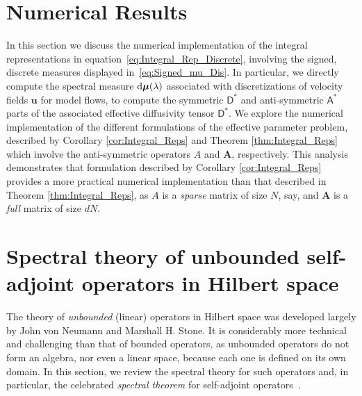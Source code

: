 \documentclass[leqno,onefignum,onetabnum]{siamltex1213}
\renewcommand{\d}{\mathrm{d}}
\newcommand{\Ab}{\mathbf{A}}
\newcommand{\Dm}{\mathsf{D}}
\newcommand{\Am}{\mathsf{A}}
\newcommand\bmu{\mbox{\boldmath${\mu}$}}
\newcommand{\vecu}{\boldsymbol{u}}
\begin{document}
\section{Numerical Results}\label{sec:Num_Results}
%
In this section we discuss the numerical implementation of the
integral representations in equation~\eqref{eq:Integral_Rep_Discrete},
involving the signed, discrete measures displayed
in~\eqref{eq:Signed_mu_Dis}. In particular, we directly compute the 
spectral measure $\d\bmu(\lambda)$ associated with discretizations of
velocity fields $\vecu $ for model flows, to compute the symmetric
$\Dm^*$ and anti-symmetric $\Am^*$ parts of the associated
effective diffusivity tensor $\Dm^*$. We explore the numerical
implementation of the different formulations of the effective
parameter problem, described by Corollary \ref{cor:Integral_Reps} and
Theorem \ref{thm:Integral_Reps} which involve the anti-symmetric
operators $A$ and $\Ab$, respectively. This analysis demonstrates that
formulation described by Corollary \ref{cor:Integral_Reps} provides a
more practical numerical implementation than that described in Theorem
\ref{thm:Integral_Reps}, as $A$ is a \emph{sparse} matrix of size $N$,
say, and $\Ab$ is a \emph{full} matrix of size $dN$.    



\appendix
%

\section{Spectral theory of unbounded self-adjoint operators in
  Hilbert space} \label{sec:Spectral_Theory}    
%
The theory of \emph{unbounded} (linear) operators in Hilbert
space was developed largely by John von Neumann and Marshall H. Stone. It
is considerably more technical and challenging than that of bounded
operators, as unbounded operators do not form an algebra, nor even a
linear space, because each one is defined on its own domain. In this
section, we review the spectral theory for such operators and, in
particular, the celebrated \emph{spectral theorem} for self-adjoint
operators~\cite{Reed-1980,Stone:64}.
\end{document}
